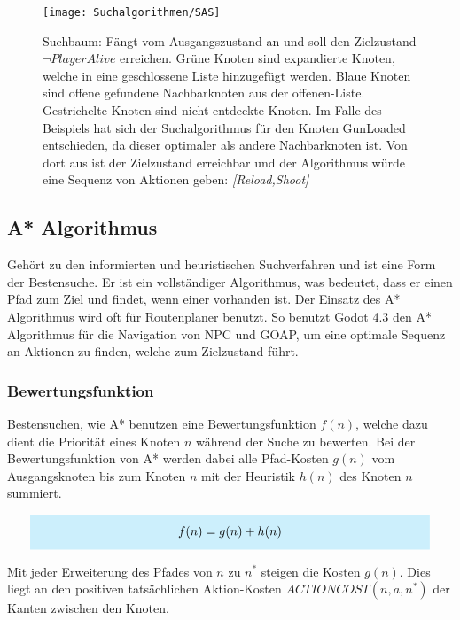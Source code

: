 \begin{figure}[h]
  \centering
  \texttt{[image: Suchalgorithmen/SAS]}
	\captionsetup{justification=justified, format=plain}
  \caption{Suchbaum: Fängt vom Ausgangszustand an und soll den Zielzustand $\lnot \textit{PlayerAlive}$ erreichen. Grüne Knoten sind expandierte Knoten, welche in eine geschlossene Liste hinzugefügt werden. Blaue Knoten sind offene gefundene Nachbarknoten aus der offenen-Liste. Gestrichelte Knoten sind nicht entdeckte Knoten. Im Falle des Beispiels hat sich der Suchalgorithmus für den Knoten GunLoaded entschieden, da dieser optimaler als andere Nachbarknoten ist. Von dort aus ist der Zielzustand erreichbar und der Algorithmus würde eine Sequenz von Aktionen geben: \textit{[Reload,Shoot]}}
  \label{Suchalgorithmen}
\end{figure}
\clearpage

\subsection{A* Algorithmus}

Gehört zu den informierten und heuristischen Suchverfahren und ist eine Form der Bestensuche. Er ist ein vollständiger Algorithmus, was bedeutet, dass er einen Pfad zum Ziel und findet, wenn einer vorhanden ist. Der Einsatz des A* Algorithmus wird oft für Routenplaner benutzt. So benutzt Godot 4.3 den A* Algorithmus für die Navigation von NPC und GOAP, um eine optimale Sequenz an Aktionen zu finden, welche zum Zielzustand führt.

\subsubsection{Bewertungsfunktion}

Bestensuchen, wie A* benutzen eine Bewertungsfunktion $f(n)$, welche dazu dient die Priorität eines Knoten $n$ während der Suche zu bewerten. Bei der Bewertungsfunktion von A* werden dabei alle Pfad-Kosten $g(n)$ vom Ausgangsknoten bis zum Knoten $n$ mit der Heuristik $h(n)$ des Knoten $n$ summiert.

\[
\highlightbox{0.9\textwidth}{$
    \begin{aligned}
			f(n) = g(n) + h(n)
    \end{aligned}
$}
\]

Mit jeder Erweiterung des Pfades von $n$ zu $n^{\ast}$ steigen die Kosten $g(n)$. Dies liegt an den positiven tatsächlichen Aktion-Kosten $ACTIONCOST(n,a,n^*)$ der Kanten zwischen den Knoten.

